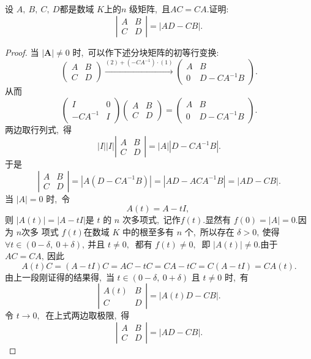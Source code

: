 \newpage
\begin{problem}
	设  $A ,\ B ,\  C,\  D  $都是数域 $ K  $上的$  n$  级矩阵,\ 且$  A C=C A .$证明:
	$$\left|\begin{array}{ll}
		A & B \\
		C & D
	\end{array}\right|=|A D-C B|.$$
\end{problem}
\begin{proof}
	当  $|\boldsymbol{A}| \neq 0 $ 时,\  可以作下述分块矩阵的初等行变换:
	$$\left(\begin{array}{ll}
		A & B \\
		C & D
	\end{array}\right) \stackrel{(2)+\left(-C A^{-1}\right) \cdot (1)}{\longrightarrow}\left(\begin{array}{cc}
		A & B \\
		0 & D-C A^{-1} B
	\end{array}\right) .$$
	从而
	$$\left(\begin{array}{cc}
		I & 0 \\
		-C A^{-1} & I
	\end{array}\right)\left(\begin{array}{ll}
		A & B \\
		C & D
	\end{array}\right)=\left(\begin{array}{cc}
		A & B \\
		0 & D-C A^{-1} B
	\end{array}\right) .$$
	两边取行列式,\  得
	$$|I||I|\left|\begin{array}{ll}
		A & B \\
		C & D
	\end{array}\right|=|A|\left|D-C A^{-1} B\right| .$$
	于是
	$$\left|\begin{array}{ll}
		A & B \\
		C & D
	\end{array}\right|=\left|A\left(D-C A^{-1} B\right)\right|=\left|A D-A C A^{-1} B\right|=|A D-C B| .$$
	当  $|A|=0 $ 时,\  令
	$$A(t)=A-t I,\ $$
	则 $ |A(t)|=|A-t I|  $是  $t$  的 $ n$  次多项式,\  记作$  f(t) .$显然有  $f(0)=|A|=0 .$因为  $n  $次多 项式 $ f(t)  $在数域  $K $ 中的根至多有  $n $ 个,\  所以存在  $\delta>0 ,\  $使得 $ \forall t \in(0-\delta,\  0+\delta) ,\  $并且  $t \neq 0 ,\ $ 都有 $ f(t) \neq 0 ,\ $ 即 $|A(t)| \neq 0 .$由于 $ A C=C A ,\ $因此
	$$A(t) C=(A-t I) C=A C-t C=C A-t C=C(A-t I)=C A(t) .$$
	由上一段刚证得的结果得,\  当 $ t \in(0-\delta,\  0+\delta)$  且 $ t \neq 0$ 时,\  有
	$$\left|\begin{array}{cc}
		A(t) & B \\
		C & D
	\end{array}\right|=|A(t) D-C B| .$$
	令  $t \rightarrow 0 ,\ $ 在上式两边取极限,\  得
	$$\left|\begin{array}{ll}
		A & B \\
		C & D
	\end{array}\right|=|A D-C B| .$$
\end{proof}
